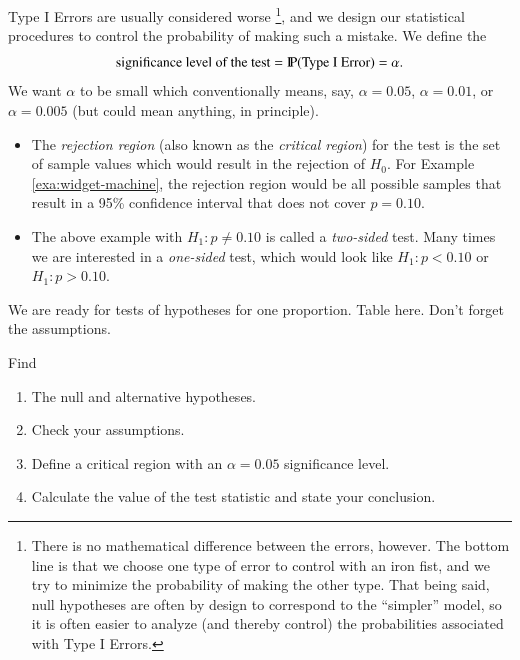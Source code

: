 \documentclass[captions=tableheading]{scrbook}
\begin{document}
Type I Errors are usually considered worse
\footnote{There is no mathematical difference between the errors, however. The bottom line is that we choose one type of error to control with an iron fist, and we try to minimize the probability of making the other type. That being said, null hypotheses are often by design to correspond to the ``simpler'' model, so it is often easier to analyze (and thereby control) the probabilities associated with Type I Errors.}, 
and we design our statistical procedures to control the probability of making such a mistake. We define the
\begin{equation}
\mbox{significance level of the test}=\P(\mbox{Type I Error})=\alpha.
\end{equation}
We want \(\alpha\) to be small which conventionally means, say, \(\alpha=0.05\), \(\alpha=0.01\), or \(\alpha=0.005\) (but could mean anything, in principle).
\begin{itemize}
\item The \emph{rejection region} (also known as the \emph{critical region}) for the test is the set of sample values which would result in the rejection of \(H_{0}\). For Example \ref{exa:widget-machine}, the rejection region would be all possible samples that result in a 95\% confidence interval that does not cover \(p=0.10\).
\item The above example with \(H_{1}:p\neq0.10\) is called a \emph{two-sided} test. Many times we are interested in a \emph{one-sided} test, which would look like \(H_{1}:p<0.10\) or \(H_{1}:p>0.10\).
\end{itemize}

We are ready for tests of hypotheses for one proportion.
Table here.
Don't forget the assumptions.

\begin{example}
Find
\begin{enumerate}
\item The null and alternative hypotheses.
\item Check your assumptions.
\item Define a critical region with an \(\alpha=0.05\) significance level.
\item Calculate the value of the test statistic and state your conclusion.
\end{enumerate}
\end{example}
\end{document}
